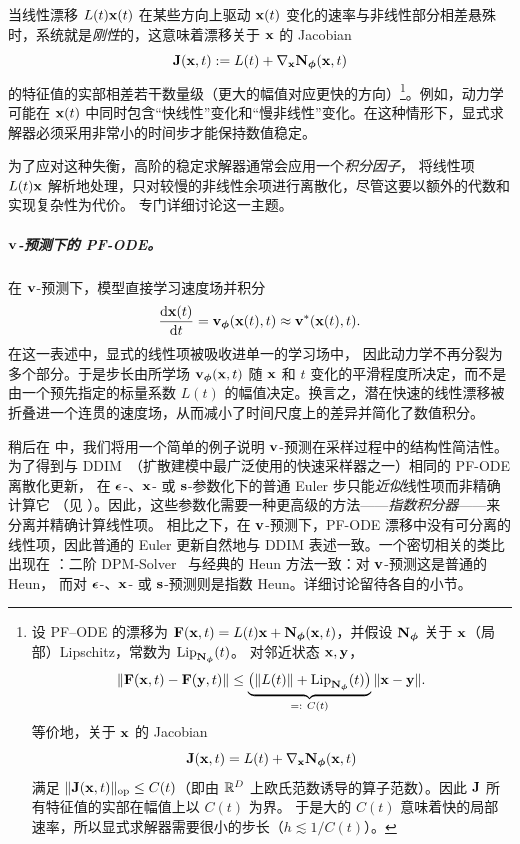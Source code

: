 当线性漂移 $L(t) {\mathbf{x}}(t)$ 在某些方向上驱动 ${\mathbf{x}}(t)$ 变化的速率与非线性部分相差悬殊时，系统就是\emph{刚性}的，这意味着漂移关于 ${\mathbf{x}}$ 的 Jacobian
\[
{\mathbf{J}}({\mathbf{x}},t):=L(t)+\nabla_{{\mathbf{x}}}{\mathbf{N}}_{\bm{\phi}}({\mathbf{x}},t)
\]
的特征值的实部相差若干数量级（更大的幅值对应更快的方向）\footnote{%
设 PF–ODE 的漂移为 ${\mathbf{F}}({\mathbf{x}},t)=L(t) {\mathbf{x}}+{\mathbf{N}}_{{\bm{\phi}}}({\mathbf{x}},t)$，并假设
${\mathbf{N}}_{{\bm{\phi}}}$ 关于 ${\mathbf{x}}$（局部）Lipschitz，常数为 $\mathrm{Lip}_{{\mathbf{N}}_{{\bm{\phi}}}}(t)$。
对邻近状态 ${\mathbf{x}},{\mathbf{y}}$，
\[
\|{\mathbf{F}}({\mathbf{x}},t)-{\mathbf{F}}({\mathbf{y}},t)\|
\le \underbrace{\big(\|L(t)\|+\mathrm{Lip}_{{\mathbf{N}}_{{\bm{\phi}}}}(t)\big)}_{=:~C(t)} \|{\mathbf{x}}-{\mathbf{y}}\|.
\]
等价地，关于 ${\mathbf{x}}$ 的 Jacobian
\[
{\mathbf{J}}({\mathbf{x}},t)=L(t)+\nabla_{{\mathbf{x}}}{\mathbf{N}}_{\bm{\phi}}({\mathbf{x}},t)
\]
满足 $\|{\mathbf{J}}({\mathbf{x}},t)\|_{\mathrm{op}} \le C(t)$（即由 $\mathbb{R}^D$ 上欧氏范数诱导的算子范数）。因此 ${\mathbf{J}}$ 所有特征值的实部在幅值上以 $C(t)$ 为界。
于是大的 $C(t)$ 意味着快的局部速率，所以显式求解器需要很小的步长（$h\lesssim 1/C(t)$）。}。例如，动力学可能在 ${\mathbf{x}}(t)$ 中同时包含“快线性”变化和“慢非线性”变化。在这种情形下，显式求解器必须采用非常小的时间步才能保持数值稳定。




为了应对这种失衡，高阶的稳定求解器通常会应用一个\emph{积分因子}，
将线性项 $L(t) {\mathbf{x}}$ 解析地处理，只对较慢的非线性余项进行离散化，尽管这要以额外的代数和实现复杂性为代价。 专门详细讨论这一主题。


\subparagraph{${\mathbf{v}}$-预测下的 PF-ODE。} 在 ${\mathbf{v}}$-预测下，模型直接学习速度场并积分
\[
\frac{\mathop{}\!\mathrm{d} {\mathbf{x}}(t)}{\mathop{}\!\mathrm{d} t}
={\mathbf{v}}_{{\bm{\phi}}}({\mathbf{x}}(t),t)
\approx {\mathbf{v}}^*({\mathbf{x}}(t),t).
\]
在这一表述中，显式的线性项被吸收进单一的学习场中，
因此动力学不再分裂为多个部分。于是步长由所学场 ${\mathbf{v}}_{{\bm{\phi}}}({\mathbf{x}},t)$ 随 ${\mathbf{x}}$ 和 $t$ 变化的平滑程度所决定，而不是由一个预先指定的标量系数 $L(t)$ 的幅值决定。换言之，潜在快速的线性漂移被折叠进一个连贯的速度场，从而减小了时间尺度上的差异并简化了数值积分。


稍后在  中，我们将用一个简单的例子说明
${\mathbf{v}}$-预测在采样过程中的结构性简洁性。
为了得到与 DDIM~\citep{song2020denoising}（扩散建模中最广泛使用的快速采样器之一）相同的 PF-ODE 离散化更新，
在 ${\bm{\epsilon}}$-、${\mathbf{x}}$- 或 ${\mathbf{s}}$-参数化下的普通 Euler 步只能\emph{近似}线性项而非精确计算它
（见 ）。因此，这些参数化需要一种更高级的方法——\emph{指数积分器}——来分离并精确计算线性项。
相比之下，在 ${\mathbf{v}}$-预测下，PF-ODE 漂移中没有可分离的线性项，因此普通的 Euler 更新自然地与 DDIM 表述一致。一个密切相关的类比出现在 ：二阶 DPM-Solver~\citep{lu2022dpm}
与经典的 Heun 方法一致：对 ${\mathbf{v}}$-预测这是普通的 Heun，
而对 ${\bm{\epsilon}}$-、${\mathbf{x}}$- 或 ${\mathbf{s}}$-预测则是指数 Heun。详细讨论留待各自的小节。



